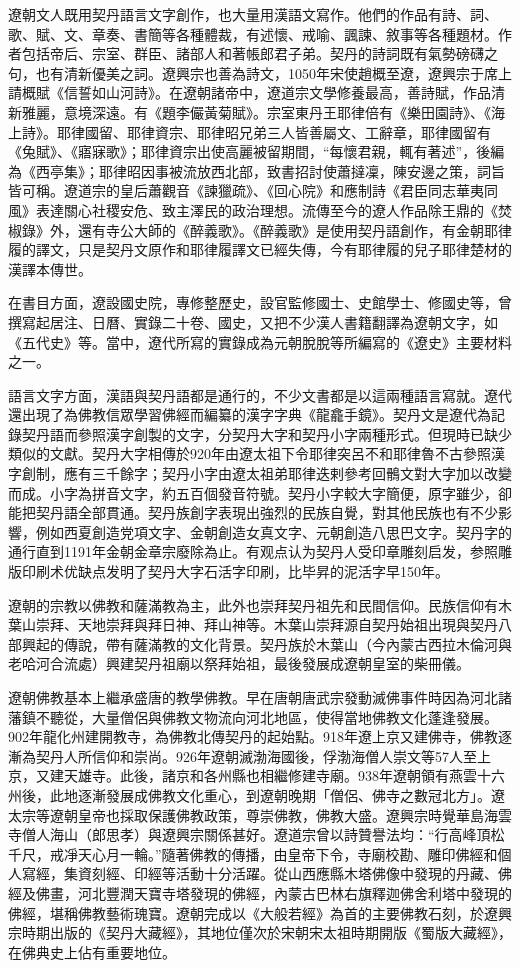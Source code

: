 遼朝文人既用契丹語言文字創作，也大量用漢語文寫作。他們的作品有詩、詞、歌、賦、文、章奏、書簡等各種體裁，有述懷、戒喻、諷諫、敘事等各種題材。作者包括帝后、宗室、群臣、諸部人和著帳郎君子弟。契丹的詩詞既有氣勢磅礴之句，也有清新優美之詞。遼興宗也善為詩文，1050年宋使趙概至遼，遼興宗于席上請概賦《信誓如山河詩》。在遼朝諸帝中，遼道宗文學修養最高，善詩賦，作品清新雅麗，意境深遠。有《題李儼黃菊賦》。宗室東丹王耶律倍有《樂田園詩》、《海上詩》。耶律國留、耶律資宗、耶律昭兄弟三人皆善屬文、工辭章，耶律國留有《兔賦》、《寤寐歌》；耶律資宗出使高麗被留期間，“每懷君親，輒有著述”，後編為《西亭集》；耶律昭因事被流放西北部，致書招討使蕭撻凜，陳安邊之策，詞旨皆可稱。遼道宗的皇后蕭觀音《諫獵疏》、《回心院》和應制詩《君臣同志華夷同風》表達關心社稷安危、致主澤民的政治理想。流傳至今的遼人作品除王鼎的《焚椒錄》外，還有寺公大師的《醉義歌》。《醉義歌》是使用契丹語創作，有金朝耶律履的譯文，只是契丹文原作和耶律履譯文已經失傳，今有耶律履的兒子耶律楚材的漢譯本傳世。

在書目方面，遼設國史院，專修整歷史，設官監修國士、史館學士、修國史等，曾撰寫起居注、日曆、實錄二十卷、國史，又把不少漢人書籍翻譯為遼朝文字，如《五代史》等。當中，遼代所寫的實錄成為元朝脫脫等所編寫的《遼史》主要材料之一。

語言文字方面，漢語與契丹語都是通行的，不少文書都是以這兩種語言寫就。遼代還出現了為佛教信眾學習佛經而編纂的漢字字典《龍龕手鏡》。契丹文是遼代為記錄契丹語而參照漢字創製的文字，分契丹大字和契丹小字兩種形式。但現時已缺少類似的文獻。契丹大字相傳於920年由遼太祖下令耶律突呂不和耶律魯不古參照漢字創制，應有三千餘字；契丹小字由遼太祖弟耶律迭剌參考回鶻文對大字加以改變而成。小字為拼音文字，約五百個發音符號。契丹小字較大字簡便，原字雖少，卻能把契丹語全部貫通。契丹族創字表現出強烈的民族自覺，對其他民族也有不少影響，例如西夏創造党項文字、金朝創造女真文字、元朝創造八思巴文字。契丹字的通行直到1191年金朝金章宗廢除為止。有观点认为契丹人受印章雕刻启发，参照雕版印刷术优缺点发明了契丹大字石活字印刷，比毕昇的泥活字早150年。

遼朝的宗教以佛教和薩滿教為主，此外也崇拜契丹祖先和民間信仰。民族信仰有木葉山崇拜、天地崇拜與拜日神、拜山神等。木葉山崇拜源自契丹始祖出現與契丹八部興起的傳說，帶有薩滿教的文化背景。契丹族於木葉山（今內蒙古西拉木倫河與老哈河合流處）興建契丹祖廟以祭拜始祖，最後發展成遼朝皇室的柴冊儀。

遼朝佛教基本上繼承盛唐的教學佛教。早在唐朝唐武宗發動滅佛事件時因為河北諸藩鎮不聽從，大量僧侶與佛教文物流向河北地區，使得當地佛教文化蓬逢發展。902年龍化州建開教寺，為佛教北傳契丹的起始點。918年遼上京又建佛寺，佛教逐漸為契丹人所信仰和崇尚。926年遼朝滅渤海國後，俘渤海僧人崇文等57人至上京，又建天雄寺。此後，諸京和各州縣也相繼修建寺廟。938年遼朝領有燕雲十六州後，此地逐漸發展成佛教文化重心，到遼朝晚期「僧侶、佛寺之數冠北方」。遼太宗等遼朝皇帝也採取保護佛教政策，尊崇佛教，佛教大盛。遼興宗時覺華島海雲寺僧人海山（郎思孝）與遼興宗關係甚好。遼道宗曾以詩贊譽法均：“行高峰頂松千尺，戒凈天心月一輪。”隨著佛教的傳播，由皇帝下令，寺廟校勘、雕印佛經和個人寫經，集資刻經、印經等活動十分活躍。從山西應縣木塔佛像中發現的丹藏、佛經及佛畫，河北豐潤天寶寺塔發現的佛經，內蒙古巴林右旗釋迦佛舍利塔中發現的佛經，堪稱佛教藝術瑰寶。遼朝完成以《大般若經》為首的主要佛教石刻，於遼興宗時期出版的《契丹大藏經》，其地位僅次於宋朝宋太祖時期開版《蜀版大藏經》，在佛典史上佔有重要地位。

